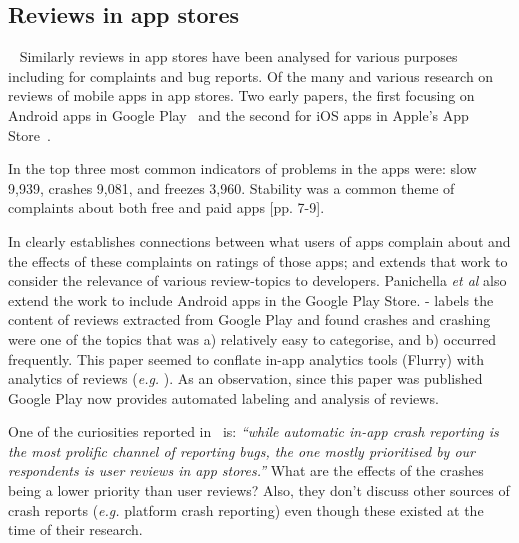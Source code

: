 \subsection{Reviews in app stores}~\label{rw-reviews-in-app-stores}
Similarly reviews in app stores have been analysed for various purposes including for complaints and bug reports. Of the many and various research on reviews of mobile apps in app stores. 
Two early papers, the first focusing on Android apps in Google Play~\textcite{fu2013_why_people_hate_your_app_making_sense_of_user_feedback_in_a_mobile_app_store} and the second for iOS apps in Apple's App Store~\textcite{khalid2015_what_do_mobile_app_users_complain_about}.

In \textcite[p. 5][]{fu2013_why_people_hate_your_app_making_sense_of_user_feedback_in_a_mobile_app_store} the top three most common indicators of problems in the apps were: slow 9,939, crashes 9,081, and freezes 3,960. Stability was a common theme of complaints about both free and paid apps [pp. 7-9].

In  clearly establishes connections between what users of  apps complain about and the effects of these complaints on ratings of those apps; and  extends that work to consider the relevance of various review-topics to developers. Panichella \emph{et al} also extend the work to include Android apps in the Google Play Store.  - labels the content of reviews extracted from Google Play and found crashes and crashing were one of the topics that was a) relatively easy to categorise, and b) occurred frequently. This paper seemed to conflate in-app analytics tools (Flurry) with analytics of reviews (\emph{e.g.} ). As an observation, since this paper was published Google Play now provides automated labeling and analysis of reviews.

One of the curiosities reported in~ is: \emph{``while automatic in-app crash reporting is the most prolific channel of reporting bugs, the one mostly prioritised by our respondents is user reviews in app stores.''} What are the effects of the crashes being a lower priority than user reviews? Also, they don't discuss other sources of crash reports (\emph{e.g.} platform crash reporting) even though these existed at the time of their research.

